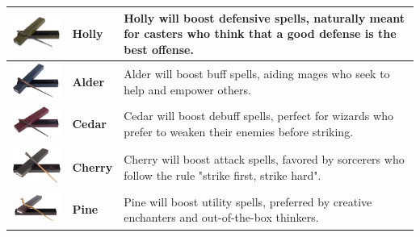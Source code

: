 \begin{tabular}{ m{4cm}m{3cm}m{6cm} } \hline
	\includegraphics[width=4cm]{../Pictures/Gameplay/Items/Wearables/Wand/Wood/Holly_wood_picture.png} & \textbf{Holly} & Holly will boost defensive spells, naturally meant for casters who think that a good defense is the best offense. \\ \hline
	\includegraphics[width=4cm]{../Pictures/Gameplay/Items/Wearables/Wand/Wood/Alder_wood_picture.png} & \textbf{Alder} & Alder will boost buff spells, aiding mages who seek to help and empower others. \\ \hline
	\includegraphics[width=4cm]{../Pictures/Gameplay/Items/Wearables/Wand/Wood/Cedar_wood_picture.png} & \textbf{Cedar} & Cedar will boost debuff spells, perfect for wizards who prefer to weaken their enemies before striking.  \\ \hline
	\includegraphics[width=4cm]{../Pictures/Gameplay/Items/Wearables/Wand/Wood/Cherry_wood_picture.png} & \textbf{Cherry} & Cherry will boost attack spells, favored by sorcerers who follow the rule "strike first, strike hard". \\ \hline
	\includegraphics[width=4cm]{../Pictures/Gameplay/Items/Wearables/Wand/Wood/Pine_wood_picture.png} & \textbf{Pine} & Pine will boost utility spells, preferred by creative enchanters and out-of-the-box thinkers. \\ \hline
\end{tabular}
